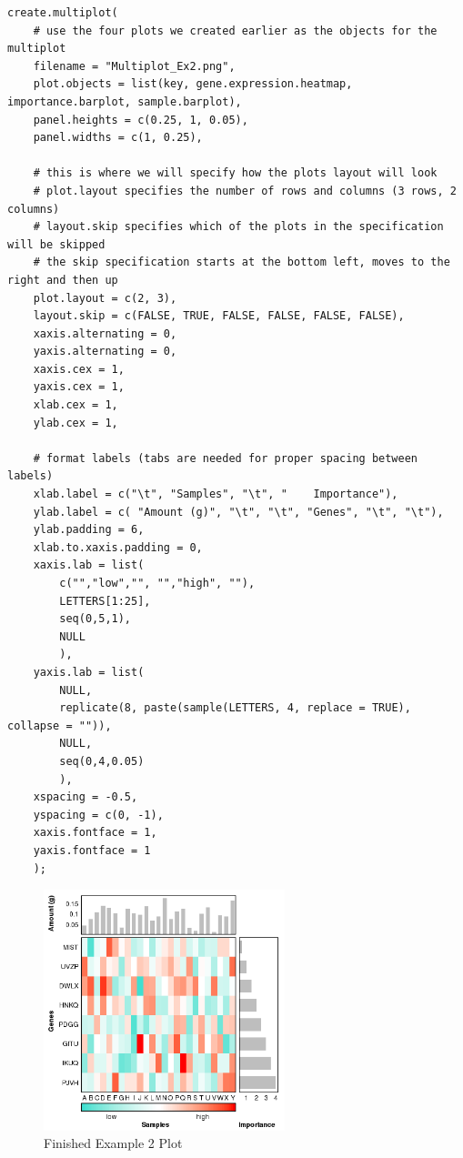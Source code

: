 \documentclass[letterpaper]{article}
\begin{document}
\begin{verbatim}
create.multiplot(
    # use the four plots we created earlier as the objects for the multiplot
    filename = "Multiplot_Ex2.png",
    plot.objects = list(key, gene.expression.heatmap, importance.barplot, sample.barplot),
    panel.heights = c(0.25, 1, 0.05),
    panel.widths = c(1, 0.25),
   
    # this is where we will specify how the plots layout will look
    # plot.layout specifies the number of rows and columns (3 rows, 2 columns)
    # layout.skip specifies which of the plots in the specification will be skipped
    # the skip specification starts at the bottom left, moves to the right and then up
    plot.layout = c(2, 3),
    layout.skip = c(FALSE, TRUE, FALSE, FALSE, FALSE, FALSE),
    xaxis.alternating = 0,
    yaxis.alternating = 0,
    xaxis.cex = 1,
    yaxis.cex = 1,
    xlab.cex = 1,
    ylab.cex = 1,

    # format labels (tabs are needed for proper spacing between labels)
    xlab.label = c("\t", "Samples", "\t", "    Importance"),
    ylab.label = c( "Amount (g)", "\t", "\t", "Genes", "\t", "\t"),
    ylab.padding = 6,
    xlab.to.xaxis.padding = 0,
    xaxis.lab = list(
        c("","low","", "","high", ""),
        LETTERS[1:25],
        seq(0,5,1),
        NULL
        ),
    yaxis.lab = list(
        NULL,
        replicate(8, paste(sample(LETTERS, 4, replace = TRUE), collapse = "")),
        NULL,
        seq(0,4,0.05)
        ),
    xspacing = -0.5,
    yspacing = c(0, -1),
    xaxis.fontface = 1,
    yaxis.fontface = 1
    );
\end{verbatim}

\begin{figure}[!ht]
  \begin{center}
     \includegraphics[width = 70mm]{Figures/Multiplot_Ex2.png}
     \caption{Finished Example 2 Plot}
     \label{fig:picture}
  \end{center}
\end{figure}
\end{document}
